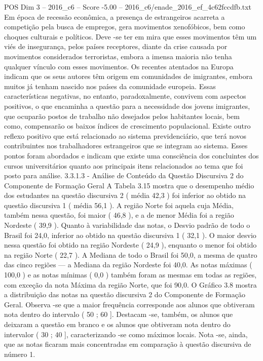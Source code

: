 \begin{textsample}{POS Dim 3 – 2016\_c6 – Score -5.00 – 2016\_c6/enade\_2016\_ef\_4c62fccdfb.txt}
Em época de recessão econômica, a presença de estrangeiros acarreta a competição pela busca de empregos, gera movimentos xenofóbicos, bem como choques culturais e políticos.
Deve -se ter em mira que esses movimentos têm um viés de insegurança, pelos países receptores, diante da crise causada por movimentos considerados terroristas, embora a imensa maioria não tenha qualquer vínculo com esses movimentos.
Os recentes atentados na Europa indicam que os seus autores têm origem em comunidades de imigrantes, embora muitos já tenham nascido nos países da comunidade europeia.
Essas características negativas, no entanto, paradoxalmente, convivem com aspectos positivos, o que encaminha a questão para a necessidade dos jovens imigrantes, que ocuparão postos de trabalho não desejados pelos habitantes locais, bem como, compensarão os baixos índices de crescimento populacional.
Existe outro reflexo positivo que está relacionado ao sistema previdenciário, que terá novos contribuintes nos trabalhadores estrangeiros que se integram ao sistema.
Esses pontos foram abordados e indicam que existe uma consciência dos concluintes dos cursos universitários quanto aos principais itens relacionados ao tema que foi posto para análise. 3.3.1.3 - Análise de Conteúdo da Questão Discursiva 2 do Componente de Formação Geral A Tabela 3.15 mostra que o desempenho médio dos estudantes na questão discursiva 2 ( média 42,3 ) foi inferior ao obtido na questão discursiva 1 ( média 56,1 ).
A região Norte foi aquela cuja Média, também nessa questão, foi maior ( 46,8 ), e a de menor Média foi a região Nordeste ( 39,9 ).
Quanto à variabilidade das notas, o Desvio padrão de todo o Brasil foi 24,0, inferior ao obtido na questão discursiva 1 ( 32,1 ).
O maior desvio nessa questão foi obtido na região Nordeste ( 24,9 ), enquanto o menor foi obtido na região Norte ( 22,7 ).
A Mediana de todo o Brasil foi 50,0, a mesma de quatro das cinco regiões — a Mediana da região Nordeste foi 40,0.
As notas máximas ( 100,0 ) e as notas mínimas ( 0,0 ) também foram as mesmas em todas as regiões, com exceção da nota Máxima da região Norte, que foi 90,0.
O Gráfico 3.8 mostra a distribuição das notas na questão discursiva 2 do Componente de Formação Geral.
Observa -se que a maior frequência corresponde aos alunos que obtiveram nota dentro do intervalo ( 50 ; 60 ].
Destacam -se, também, os alunos que deixaram a questão em branco e os alunos que obtiveram nota dentro do intervalor ( 30 ; 40 ], caracterizando -se como máximos locais.
Nota -se, ainda, que as notas ficaram mais concentradas em comparação à questão discursiva de número 1.

\end{textsample}
